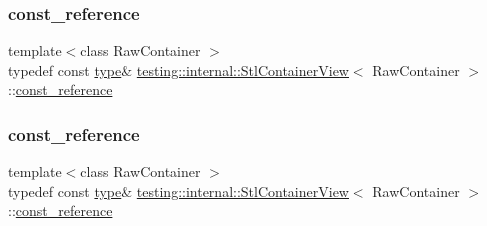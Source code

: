 \subsubsection{\texorpdfstring{const\_reference}{const\_reference}\hspace{0.1cm}{\footnotesize\ttfamily [1/3]}}
{\footnotesize\ttfamily template$<$class Raw\+Container $>$ \\
typedef const \mbox{\hyperlink{classtesting_1_1internal_1_1_stl_container_view_a2b2c63a6dcdbfe63fb0ee121ebf463ba}{type}}\& \mbox{\hyperlink{classtesting_1_1internal_1_1_stl_container_view}{testing\+::internal\+::\+Stl\+Container\+View}}$<$ Raw\+Container $>$\+::\mbox{\hyperlink{classtesting_1_1internal_1_1_stl_container_view_a9cd4f6ed689b3938cdb7b3c4cbf1b36b}{const\+\_\+reference}}}

\mbox{\label{classtesting_1_1internal_1_1_stl_container_view_a9cd4f6ed689b3938cdb7b3c4cbf1b36b}} 
\subsubsection{\texorpdfstring{const\_reference}{const\_reference}\hspace{0.1cm}{\footnotesize\ttfamily [2/3]}}
{\footnotesize\ttfamily template$<$class Raw\+Container $>$ \\
typedef const \mbox{\hyperlink{classtesting_1_1internal_1_1_stl_container_view_a2b2c63a6dcdbfe63fb0ee121ebf463ba}{type}}\& \mbox{\hyperlink{classtesting_1_1internal_1_1_stl_container_view}{testing\+::internal\+::\+Stl\+Container\+View}}$<$ Raw\+Container $>$\+::\mbox{\hyperlink{classtesting_1_1internal_1_1_stl_container_view_a9cd4f6ed689b3938cdb7b3c4cbf1b36b}{const\+\_\+reference}}}

\mbox{\label{classtesting_1_1internal_1_1_stl_container_view_a9cd4f6ed689b3938cdb7b3c4cbf1b36b}} 

